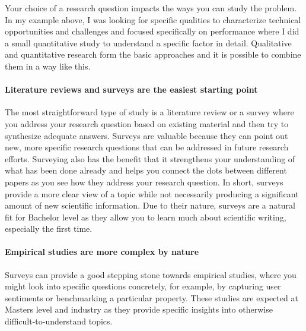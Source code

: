 Your choice of a research question impacts the ways you can study the problem.
In my example above, I was looking for specific qualities to characterize technical opportunities and challenges and focused specifically on performance where I did a small quantitative study to understand a specific factor in detail.
Qualitative and quantitative research form the basic approaches and it is possible to combine them in a way like this.


\paragraph{Literature reviews and surveys are the easiest starting point}

The most straightforward type of study is a literature review or a survey where you address your research question based on existing material and then try to synthesize adequate answers.
Surveys are valuable because they can point out new, more specific research questions that can be addressed in future research efforts.
Surveying also has the benefit that it strengthens your understanding of what has been done already and helps you connect the dots between different papers as you see how they address your research question.
In short, surveys provide a more clear view of a topic while not necessarily producing a significant amount of new scientific information.
Due to their nature, surveys are a natural fit for Bachelor level as they allow you to learn much about scientific writing, especially the first time.

\paragraph{Empirical studies are more complex by nature}

Surveys can provide a good stepping stone towards empirical studies, where you might look into specific questions concretely, for example, by capturing user sentiments or benchmarking a particular property.
These studies are expected at Masters level and industry as they provide specific insights into otherwise difficult-to-understand topics.

